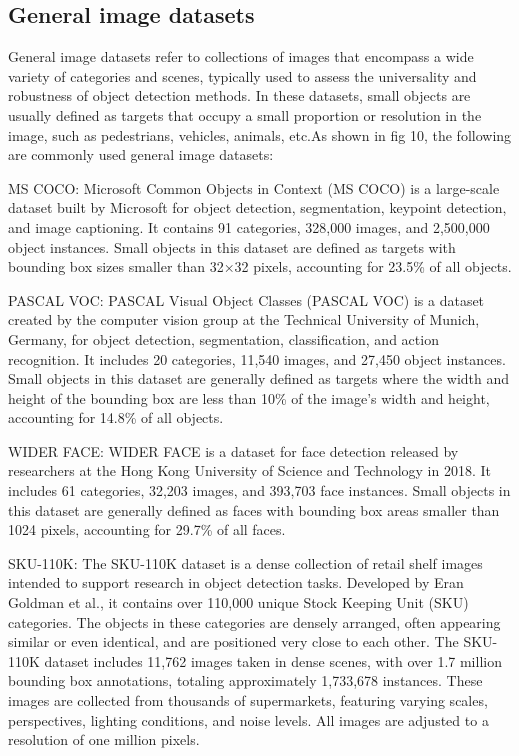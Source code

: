 \documentclass[journal]{IEEEtran}
\begin{document}
\subsection{General image datasets}

General image datasets refer to collections of images that encompass a wide variety of categories and scenes, typically used to assess the universality and robustness of object detection methods. In these datasets, small objects are usually defined as targets that occupy a small proportion or resolution in the image, such as pedestrians, vehicles, animals, etc.As shown in fig 10, the following are commonly used general image datasets:

MS COCO: Microsoft Common Objects in Context (MS COCO) is a large-scale dataset built by Microsoft for object detection, segmentation, keypoint detection, and image captioning. It contains 91 categories, 328,000 images, and 2,500,000 object instances. Small objects in this dataset are defined as targets with bounding box sizes smaller than 32×32 pixels, accounting for 23.5\% of all objects. 

PASCAL VOC: PASCAL Visual Object Classes (PASCAL VOC) is a dataset created by the computer vision group at the Technical University of Munich, Germany, for object detection, segmentation, classification, and action recognition. It includes 20 categories, 11,540 images, and 27,450 object instances. Small objects in this dataset are generally defined as targets where the width and height of the bounding box are less than 10\% of the image’s width and height, accounting for 14.8\% of all objects. 

WIDER FACE\cite{yang2016wider}: WIDER FACE is a dataset for face detection released by researchers at the Hong Kong University of Science and Technology in 2018. It includes 61 categories, 32,203 images, and 393,703 face instances. Small objects in this dataset are generally defined as faces with bounding box areas smaller than 1024 pixels, accounting for 29.7\% of all faces.

SKU-110K\cite{goldman2019precise}: The SKU-110K dataset is a dense collection of retail shelf images intended to support research in object detection tasks. Developed by Eran Goldman et al., it contains over 110,000 unique Stock Keeping Unit (SKU) categories. The objects in these categories are densely arranged, often appearing similar or even identical, and are positioned very close to each other. The SKU-110K dataset includes 11,762 images taken in dense scenes, with over 1.7 million bounding box annotations, totaling approximately 1,733,678 instances. These images are collected from thousands of supermarkets, featuring varying scales, perspectives, lighting conditions, and noise levels. All images are adjusted to a resolution of one million pixels.
\end{document}
